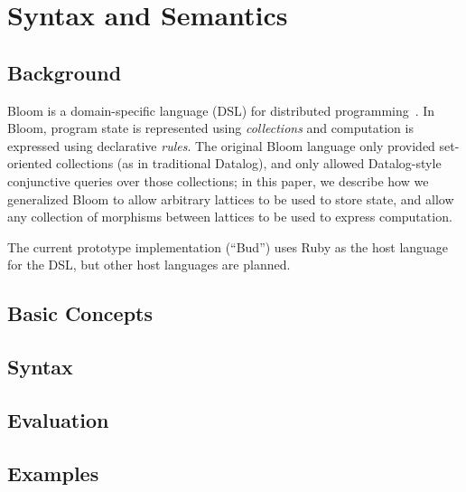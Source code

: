 \section{Syntax and Semantics}

\subsection{Background}
Bloom is a domain-specific language (DSL) for distributed
programming~\cite{Alvaro2011,bloom}. In Bloom, program state is represented
using \emph{collections} and computation is expressed using declarative
\emph{rules}. The original Bloom language only provided set-oriented collections
(as in traditional Datalog), and only allowed Datalog-style conjunctive queries
over those collections; in this paper, we describe how we generalized Bloom to
allow arbitrary lattices to be used to store state, and allow any collection of
morphisms between lattices to be used to express computation.

The current prototype implementation (``Bud'') uses Ruby as the host language
for the DSL, but other host languages are planned.

\subsection{Basic Concepts}

\subsection{Syntax}

\subsection{Evaluation}

\subsection{Examples}
